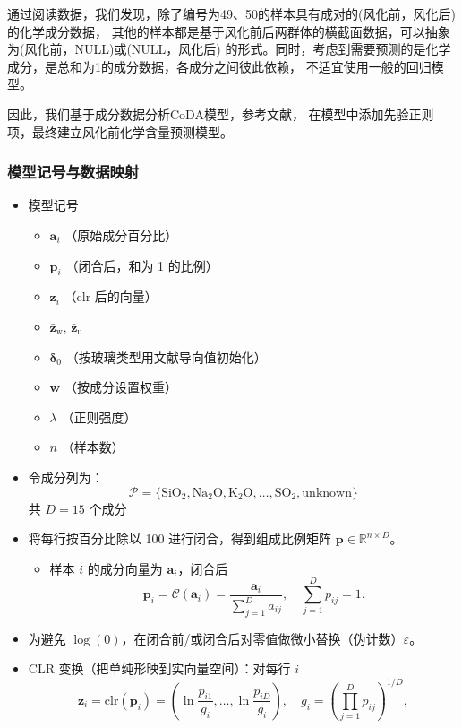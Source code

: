 \documentclass[withoutpreface,bwprint]{cumcmthesis}
\begin{document}
通过阅读数据，我们发现，除了编号为49、50的样本具有成对的(风化前，风化后)的化学成分数据，
其他的样本都是基于风化前后两群体的横截面数据，可以抽象为(风化前，NULL)或(NULL，风化后)
的形式。同时，考虑到需要预测的是化学成分，是总和为1的成分数据，各成分之间彼此依赖，
不适宜使用一般的回归模型。

因此，我们基于成分数据分析CoDA模型，参考文献\cite{司守奎2011数学建模算法与应用}，
在模型中添加先验正则项，最终建立风化前化学含量预测模型。

\subsubsection{模型记号与数据映射}

\begin{itemize}
\item 模型记号
\begin{itemize}
    \item $\mathbf{a}_i$ \quad （原始成分百分比）  
    \item $\mathbf{p}_i$ \quad （闭合后，和为 1 的比例）  
    \item $\mathbf{z}_i$ \quad （clr 后的向量）  
    \item $\bar{\mathbf{z}}_\text{w},\, \bar{\mathbf{z}}_\text{u}$ \quad  
    \item $\boldsymbol{\delta}_0$ \quad （按玻璃类型用文献导向值初始化）  
    \item $\mathbf{w}$ \quad （按成分设置权重）  
    \item $\lambda$ \quad （正则强度） 
    \item $n$ \quad （样本数）
\end{itemize}

\item 令成分列为：
\[
    \mathcal{P} = \{\mathrm{SiO}_2, \mathrm{Na}_2\mathrm{O}, \mathrm{K}_2\mathrm{O}, \ldots, \mathrm{SO}_2, \text{unknown}\}
\]
共 $D = 15$ 个成分

\item 将每行按百分比除以 100 进行闭合，得到组成比例矩阵 $\mathbf{p} \in \mathbb{R}^{n \times D}$。
    \begin{itemize}
        \item 样本 $i$ 的成分向量为 $\mathbf{a}_i$，闭合后
        \[
        \mathbf{p}_i = \mathcal{C}(\mathbf{a}_i) = \frac{\mathbf{a}_i}{\sum_{j=1}^D a_{ij}}, \quad \sum_{j=1}^D p_{ij} = 1.
        \]
    \end{itemize}

\item 为避免 $\log(0)$，在闭合前/或闭合后对零值做微小替换（伪计数）$\varepsilon$。

\item CLR 变换（把单纯形映到实向量空间）：对每行 $i$
    \[
    \mathbf{z}_i = \text{clr}(\mathbf{p}_i) = \left( \ln \frac{p_{i1}}{g_i}, \ldots, \ln \frac{p_{iD}}{g_i} \right), \quad g_i = \left( \prod_{j=1}^D p_{ij} \right)^{1/D},
    \]
\end{itemize}
\end{document}
